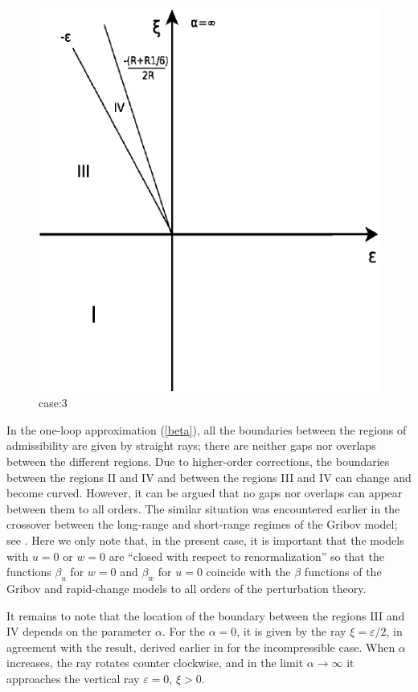 \documentclass[12pt]{article}
\begin{document}
\begin{figure}
 \includegraphics{./Diagram8.pdf}
 \caption{case:3}
 \label{fig:7}
\end{figure}


In the one-loop approximation (\ref{beta}), all the boundaries between the
regions of admissibility are given by straight rays; there are neither gaps
nor overlaps between the different regions. Due to higher-order corrections,
the boundaries between the regions II and IV and between the regions III and
IV can change and become curved. However, it can be argued that no gaps nor
overlaps can appear between them to all orders. The similar situation was
encountered earlier in the crossover between the long-range and short-range
regimes of the Gribov model; see \cite{Levy}. Here we only note that,
in the present case, it is important that the models with $u=0$ or $w=0$ are
``closed with respect to renormalization'' so that the functions $\beta_{u}$
for $w=0$ and $\beta_{w}$ for $u=0$ coincide with the $\beta$ functions of
the Gribov and rapid-change models to all orders of the perturbation theory.

It remains to note that the location of the boundary between the regions
III and IV depends on the parameter $\alpha$. For the $\alpha=0$, it is
given by the ray $\xi=\varepsilon/2$, in agreement with the result, derived
earlier in \cite{AIK} for the incompressible case. When $\alpha$ increases,
the ray rotates counter clockwise, and in the limit $\alpha\to\infty$ it
approaches the vertical ray $\varepsilon=0$, $\xi>0$.
\end{document}
